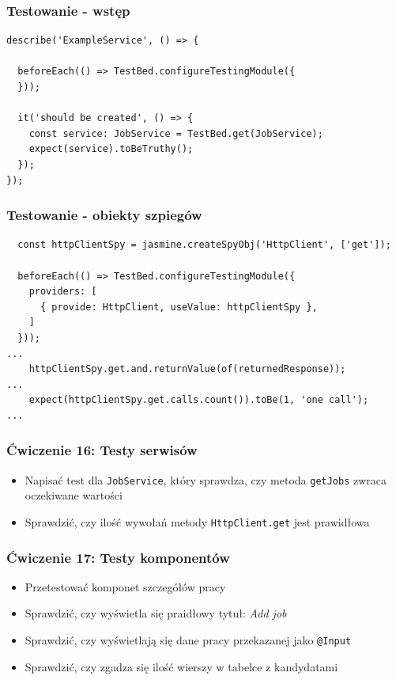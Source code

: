 \documentclass{beamer}
\begin{document}
\begin{frame}[fragile]
    \frametitle{Testowanie - wstęp}
\begin{lstlisting}
describe('ExampleService', () => {

  beforeEach(() => TestBed.configureTestingModule({
  }));

  it('should be created', () => {
    const service: JobService = TestBed.get(JobService);
    expect(service).toBeTruthy();
  });
});
\end{lstlisting}
\end{frame}

\begin{frame}[fragile]
    \frametitle{Testowanie - obiekty szpiegów}
\begin{lstlisting}
  const httpClientSpy = jasmine.createSpyObj('HttpClient', ['get']);

  beforeEach(() => TestBed.configureTestingModule({
    providers: [
      { provide: HttpClient, useValue: httpClientSpy },
    ]
  }));
...
    httpClientSpy.get.and.returnValue(of(returnedResponse));
...
    expect(httpClientSpy.get.calls.count()).toBe(1, 'one call');
...
\end{lstlisting}
\end{frame}

\begin{frame}
    \frametitle{Ćwiczenie 16: Testy serwisów}
    \begin{itemize}
        \item Napisać test dla \lstinline{JobService}, który sprawdza, czy metoda \lstinline{getJobs} zwraca oczekiwane wartości
	\item Sprawdzić, czy ilość wywołań metody \lstinline{HttpClient.get} jest prawidłowa
    \end{itemize}
\end{frame}

\begin{frame}
    \frametitle{Ćwiczenie 17: Testy komponentów}
    \begin{itemize}
	\item Przetestować komponet szczegółów pracy
        \item Sprawdzić, czy wyświetla się praidłowy tytuł: \textit{Add job}
        \item Sprawdzić, czy wyświetlają się dane pracy przekazanej jako \lstinline{@Input}
        \item Sprawdzić, czy zgadza się ilość wierszy w tabelce z kandydatami
    \end{itemize}
\end{frame}
\end{document}

